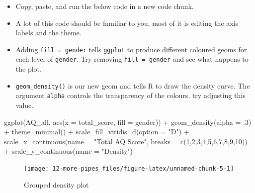\documentclass[
  oneside]{book}
\newenvironment{Shaded}{\begin{snugshade}}{\end{snugshade}}
\newcommand{\AttributeTok}[1]{\textcolor[rgb]{0.77,0.63,0.00}{#1}}
\newcommand{\DecValTok}[1]{\textcolor[rgb]{0.00,0.00,0.81}{#1}}
\newcommand{\FunctionTok}[1]{\textcolor[rgb]{0.00,0.00,0.00}{#1}}
\newcommand{\NormalTok}[1]{#1}
\newcommand{\SpecialCharTok}[1]{\textcolor[rgb]{0.00,0.00,0.00}{#1}}
\newcommand{\StringTok}[1]{\textcolor[rgb]{0.31,0.60,0.02}{#1}}
\providecommand{\tightlist}{%
  \setlength{\itemsep}{0pt}\setlength{\parskip}{0pt}}
\begin{document}
\begin{itemize}
\tightlist
\item
  Copy, paste, and run the below code in a new code chunk.
\item
  A lot of this code should be familiar to you, most of it is editing the axis labels and the theme.
\item
  Adding \texttt{fill\ =\ gender} tells \texttt{ggplot} to produce different coloured geoms for each level of \texttt{gender}. Try removing \texttt{fill\ =\ gender} and see what happens to the plot.
\item
  \texttt{geom\_density()} is our new geom and tells R to draw the density curve. The argument \texttt{alpha} controls the transparency of the colours, try adjusting this value.
\end{itemize}

\begin{Shaded}
\begin{Highlighting}[]
\FunctionTok{ggplot}\NormalTok{(AQ\_all, }\FunctionTok{aes}\NormalTok{(}\AttributeTok{x =}\NormalTok{ total\_score, }\AttributeTok{fill =}\NormalTok{ gender)) }\SpecialCharTok{+}
  \FunctionTok{geom\_density}\NormalTok{(}\AttributeTok{alpha =}\NormalTok{ .}\DecValTok{3}\NormalTok{) }\SpecialCharTok{+}
  \FunctionTok{theme\_minimal}\NormalTok{() }\SpecialCharTok{+}
  \FunctionTok{scale\_fill\_viridis\_d}\NormalTok{(}\AttributeTok{option =} \StringTok{"D"}\NormalTok{) }\SpecialCharTok{+}
  \FunctionTok{scale\_x\_continuous}\NormalTok{(}\AttributeTok{name =} \StringTok{"Total AQ Score"}\NormalTok{, }\AttributeTok{breaks =} \FunctionTok{c}\NormalTok{(}\DecValTok{1}\NormalTok{,}\DecValTok{2}\NormalTok{,}\DecValTok{3}\NormalTok{,}\DecValTok{4}\NormalTok{,}\DecValTok{5}\NormalTok{,}\DecValTok{6}\NormalTok{,}\DecValTok{7}\NormalTok{,}\DecValTok{8}\NormalTok{,}\DecValTok{9}\NormalTok{,}\DecValTok{10}\NormalTok{)) }\SpecialCharTok{+}
  \FunctionTok{scale\_y\_continuous}\NormalTok{(}\AttributeTok{name =} \StringTok{"Density"}\NormalTok{)}
\end{Highlighting}
\end{Shaded}

\begin{figure}

{\centering \texttt{[image: 12-more-pipes\_files/figure-latex/unnamed-chunk-5-1]} 

}

\caption{Grouped density plot}\label{fig:unnamed-chunk-5}
\end{figure}
\end{document}
